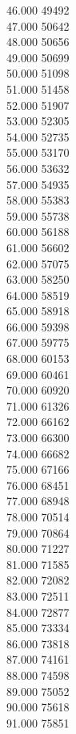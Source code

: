 { 46.000	49492 \\
 47.000	50642 \\
 48.000	50656 \\
 49.000	50699 \\
 50.000	51098 \\
 51.000	51458 \\
 52.000	51907 \\
 53.000	52305 \\
 54.000	52735 \\
 55.000	53170 \\
 56.000	53632 \\
 57.000	54935 \\
 58.000	55383 \\
 59.000	55738 \\
 60.000	56188 \\
 61.000	56602 \\
 62.000	57075 \\
 63.000	58250 \\
 64.000	58519 \\
 65.000	58918 \\
 66.000	59398 \\
 67.000	59775 \\
 68.000	60153 \\
 69.000	60461 \\
 70.000	60920 \\
 71.000	61326 \\
 72.000	66162 \\
 73.000	66300 \\
 74.000	66682 \\
 75.000	67166 \\
 76.000	68451 \\
 77.000	68948 \\
 78.000	70514 \\
 79.000	70864 \\
 80.000	71227 \\
 81.000	71585 \\
 82.000	72082 \\
 83.000	72511 \\
 84.000	72877 \\
 85.000	73334 \\
 86.000	73818 \\
 87.000	74161 \\
 88.000	74598 \\
 89.000	75052 \\
 90.000	75618 \\
 91.000	75851 \\
}
